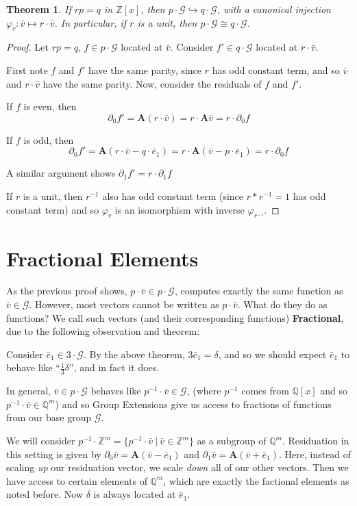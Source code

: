 \documentclass[runningheads]{llncs}
\newcommand{\G}{\mathcal{G}}
\newcommand{\Z}{\mathbb{Z}}
\newcommand{\Q}{\mathbb{Q}}
\newcommand{\2}{\textbf{2}}
\newcommand{\Am}{\textbf{A}}
\newcommand{\del}{\partial}
\newcommand{\vv}{\bar{v}}
\newcommand{\e}{\bar{e}}
\newtheorem{thm}{Theorem}
\begin{document}
\begin{thm}
  If $rp = q$ in $\Z[x]$, then $p \cdot \G \hookrightarrow q \cdot \G$, 
  with a canonical injection $\varphi_r : \vv \mapsto r \cdot \vv$. 
  In particular, if $r$ is a unit, then $p \cdot \G \cong q \cdot \G$.
\end{thm}

\begin{proof}
  Let $rp = q$, $f \in p \cdot \G$ located at $\vv$. 
  Consider $f' \in q \cdot \G$ located at $r \cdot \vv$.

  First note $f$ and $f'$ have the same parity, since 
  $r$ has odd constant term, and so $\vv$ and $r \cdot \vv$
  have the same parity. Now, consider the residuals of $f$ and $f'$. 
  
  If $f$ is even, then 
  \[ \del_0 f' = \Am (r \cdot \vv) = r \cdot \Am \vv = r \cdot \del_0 f \]

  If $f$ is odd, then
  \[ \del_0 f' = \Am (r \cdot \vv - q \cdot \e_1) 
               = r \cdot \Am (\vv - p \cdot \e_1)
               = r \cdot \del_0 f \]

  A similar argument shows $\del_1 f' = r \cdot \del_1 f$

  If $r$ is a unit, then $r^{-1}$ also has odd constant term 
  (since $r * r^{-1} = 1$ has odd constant term) and so $\varphi_r$
  is an isomorphism with inverse $\varphi_{r^{-1}}$.
\end{proof}

\section{Fractional Elements}
As the previous proof shows, $p \cdot \vv \in p \cdot \G$, 
computes exactly the same function as $\vv \in \G$.
However, most vectors cannot be written as $p \cdot \vv$. 
What do they do as functions?
We call such vectors (and their corresponding functions)
\textbf{Fractional}, due to the following observation and theorem:

Consider $\e_1 \in 3 \cdot \G$. By the above theorem, $3\e_1 = \delta$,
and so we should expect $\e_1$ to behave like ``$\frac{1}{3}\delta$'', 
and in fact it does.

In general, $\vv \in p \cdot \G$ behaves like $p^{-1} \cdot \vv \in \G$,
(where $p^{-1}$ comes from $\Q[x]$ and so $p^{-1} \cdot \vv \in \Q^m$)
and so Group Extensions give us access to fractions of functions from 
our base group $\G$.

We will consider $p^{-1} \cdot \Z^m = \{ p^{-1} \cdot \vv~|~\vv \in \Z^m \}$
as a subgroup of $\Q^m$. Residuation in this setting is given by
$\del_0 \vv = \Am (\vv - \e_1)$ and $\del_1 \vv = \Am (\vv + \e_1)$.
Here, instead of scaling \emph{up} our residuation vector, 
we scale \emph{down} all of our other vectors. Then we have access to 
certain elements of $\Q^m$, which are exactly the factional elements
as noted before. Now $\delta$ is always located at $\e_1$.
\end{document}
